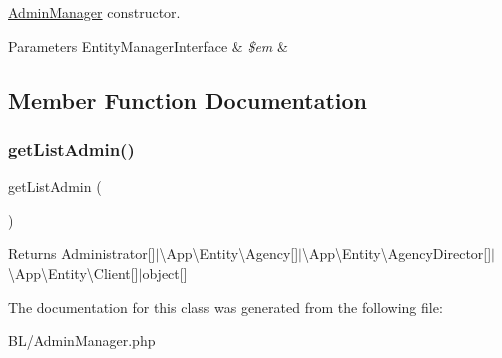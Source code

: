 \mbox{\hyperlink{class_app_1_1_b_l_1_1_admin_manager}{Admin\+Manager}} constructor. 
\begin{DoxyParams}[1]{Parameters}
Entity\+Manager\+Interface & {\em \$em} & \\
\hline
\end{DoxyParams}


\subsection{Member Function Documentation}
\mbox{\label{class_app_1_1_b_l_1_1_admin_manager_aec8ce9ecee7a9381b110b6bb111cb2e3}} 
\subsubsection{\texorpdfstring{getListAdmin()}{getListAdmin()}}
{\footnotesize\ttfamily get\+List\+Admin (\begin{DoxyParamCaption}{ }\end{DoxyParamCaption})}

\begin{DoxyReturn}{Returns}
Administrator\mbox{[}\mbox{]}$\vert$\textbackslash{}\+App\textbackslash{}\+Entity\textbackslash{}\+Agency\mbox{[}\mbox{]}$\vert$\textbackslash{}\+App\textbackslash{}\+Entity\textbackslash{}\+Agency\+Director\mbox{[}\mbox{]}$\vert$\textbackslash{}\+App\textbackslash{}\+Entity\textbackslash{}\+Client\mbox{[}\mbox{]}$\vert$object\mbox{[}\mbox{]} 
\end{DoxyReturn}


The documentation for this class was generated from the following file\+:\begin{DoxyCompactItemize}
\item 
B\+L/Admin\+Manager.\+php\end{DoxyCompactItemize}
